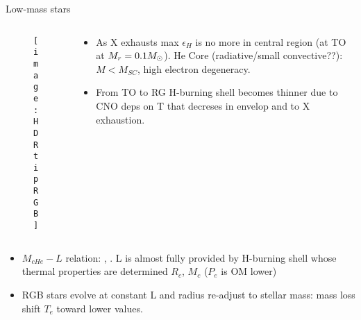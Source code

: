 \begin{frame}{Low-mass stars}
\begin{columns}[T]\begin{column}{0.44\textwidth}
\begin{figure}[!ht]
\texttt{[image: HDRtipRGB]}\label{fig:HDRtipRGB}
\end{figure}
\end{column}
\begin{column}{0.55\textwidth}
\begin{itemize}
\item As X exhausts max $\epsilon_H$ is no more in central region (at TO at $M_r=0.1M_{\odot}{}$). He Core (radiative/small convective??): $M<M_{SC}$, high electron degeneracy.
\item From TO to RG H-burning shell becomes thinner due to CNO deps on T that decreses in envelop and to X exhaustion.
\end{itemize}
\end{column}\end{columns}
\begin{itemize}
\item $M_{cHe}-L$ relation: , . L is almost fully provided by H-burning shell whose thermal properties are determined $R_c$, $M_c$ ($P_e$ is OM lower)
\item RGB stars evolve at constant L and radius re-adjust to stellar mass: mass loss shift $T_e$ toward lower values.
\end{itemize}
\end{frame}

